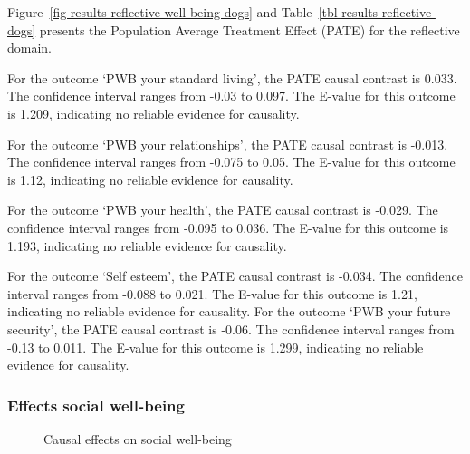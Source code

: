 \documentclass[
  singlecolumn,
  9pt]{article}
\begin{document}
\begin{table}
{\addtocounter{table}{-1}

}

\end{table}%

Figure~\ref{fig-results-reflective-well-being-dogs} and
Table~\ref{tbl-results-reflective-dogs} presents the Population Average
Treatment Effect (PATE) for the reflective domain.

For the outcome `PWB your standard living', the PATE causal contrast is
0.033. The confidence interval ranges from -0.03 to 0.097. The E-value
for this outcome is 1.209, indicating no reliable evidence for
causality.

For the outcome `PWB your relationships', the PATE causal contrast is
-0.013. The confidence interval ranges from -0.075 to 0.05. The E-value
for this outcome is 1.12, indicating no reliable evidence for causality.

For the outcome `PWB your health', the PATE causal contrast is -0.029.
The confidence interval ranges from -0.095 to 0.036. The E-value for
this outcome is 1.193, indicating no reliable evidence for causality.

For the outcome `Self esteem', the PATE causal contrast is -0.034. The
confidence interval ranges from -0.088 to 0.021. The E-value for this
outcome is 1.21, indicating no reliable evidence for causality. For the
outcome `PWB your future security', the PATE causal contrast is -0.06.
The confidence interval ranges from -0.13 to 0.011. The E-value for this
outcome is 1.299, indicating no reliable evidence for causality.

\newpage{}

\subsubsection{Effects social
well-being}\label{effects-social-well-being-1}

\begin{figure}


\caption{\label{fig-results-social-wellbeing-dogs}Causal effects on
social well-being}

\end{figure}%

\newpage{}
\end{document}
